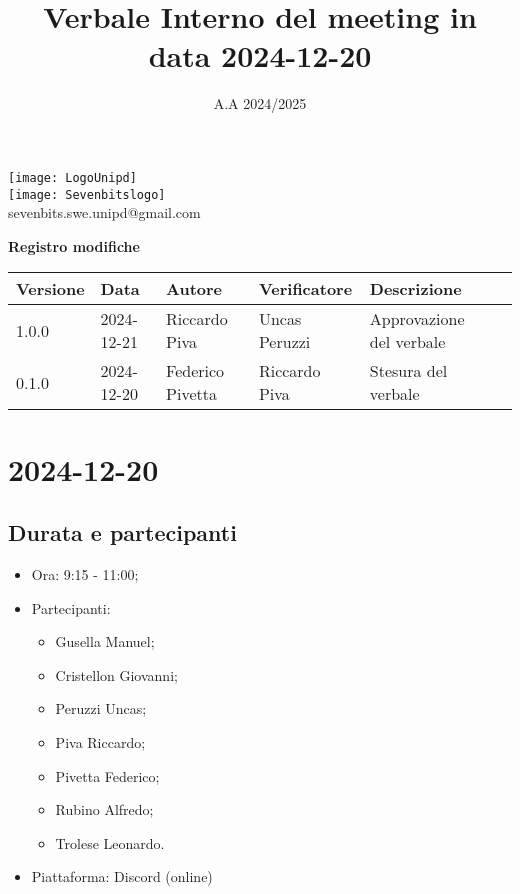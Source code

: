 \documentclass[10pt]{article}
\title{Verbale Interno del meeting in data 2024-12-20}
\date{A.A 2024/2025}
\begin{document}
\maketitle
\center 
\texttt{[image: LogoUnipd]}\\
\texttt{[image: Sevenbitslogo]}\\
sevenbits.swe.unipd@gmail.com\\
\vspace{2mm}

\textbf{Registro modifiche}\\
\vspace{2mm}
\begin{tabular}{|l|l|l|l|l|l|}
\hline
\textbf{Versione} & \textbf{Data} & \textbf{Autore} & \textbf{Verificatore} & \textbf{Descrizione} \\
\hline
1.0.0 & 2024-12-21 & Riccardo Piva & Uncas Peruzzi & Approvazione del verbale\\
\hline
0.1.0 & 2024-12-20 & Federico Pivetta & Riccardo Piva & Stesura del verbale\\
\hline
\end{tabular}

\newpage
\raggedright
\tableofcontents

\newpage
\section{2024-12-20}
\subsection{Durata e partecipanti}
\begin{itemize}
\item Ora: 9:15 - 11:00;
\item Partecipanti: 	
	\begin{itemize}
	    \item Gusella Manuel;
            \item Cristellon Giovanni;
            \item Peruzzi Uncas;
            \item Piva Riccardo;
            \item Pivetta Federico;
            \item Rubino Alfredo;
            \item Trolese Leonardo.
	\end{itemize}
\item Piattaforma: Discord (online)
\end{itemize}
\end{document}
